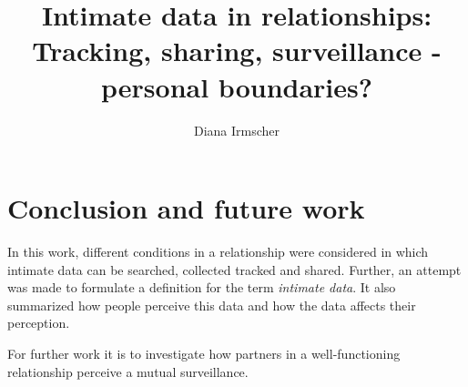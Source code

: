 \documentclass[journal]{vgtc}                %
\title{Intimate data in relationships: Tracking, sharing, surveillance - personal boundaries?}
\author{Diana Irmscher}
\begin{document}

\maketitle

%
%












\section{Conclusion and future work}
In this work, different conditions in a relationship  were considered in which intimate data can be searched, collected tracked and shared.
Further, an attempt was made to formulate a definition for the term \textit{intimate data}. It also summarized how people perceive this data and how the data affects their perception.

For further work it is to investigate how partners in a well-functioning relationship perceive a mutual surveillance.

\label{sec:conculsion}


\printbibliography
\end{document}
